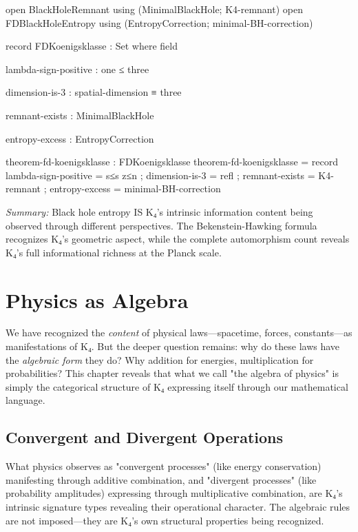 \documentclass[11pt,a4paper]{book}
\begin{document}
\begin{code}
open BlackHoleRemnant using (MinimalBlackHole; K4-remnant)
open FDBlackHoleEntropy using (EntropyCorrection; minimal-BH-correction)

record FDKoenigsklasse : Set where
  field
    
    lambda-sign-positive : one ≤ three
    
    dimension-is-3 : spatial-dimension ≡ three
    
    remnant-exists : MinimalBlackHole
    
    entropy-excess : EntropyCorrection
    
theorem-fd-koenigsklasse : FDKoenigsklasse
theorem-fd-koenigsklasse = record
  { lambda-sign-positive = s≤s z≤n
  ; dimension-is-3 = refl
  ; remnant-exists = K4-remnant
  ; entropy-excess = minimal-BH-correction
  }
\end{code}

\medskip
\noindent\textit{Summary:} Black hole entropy IS K₄'s intrinsic information content being observed through different perspectives. The Bekenstein-Hawking formula recognizes K₄'s geometric aspect, while the complete automorphism count reveals K₄'s full informational richness at the Planck scale.

\chapter{Physics as Algebra}
\label{chap:algebraic-structure-physics}

We have recognized the \emph{content} of physical laws—spacetime, forces, constants—as manifestations of K₄. But the deeper question remains: why do these laws have the \emph{algebraic form} they do? Why addition for energies, multiplication for probabilities? This chapter reveals that what we call "the algebra of physics" is simply the categorical structure of K₄ expressing itself through our mathematical language.

\section{Convergent and Divergent Operations}
\label{sec:algebraic-ops}

What physics observes as "convergent processes" (like energy conservation) manifesting through additive combination, and "divergent processes" (like probability amplitudes) expressing through multiplicative combination, are K₄'s intrinsic signature types revealing their operational character. The algebraic rules are not imposed—they are K₄'s own structural properties being recognized.
\end{document}
